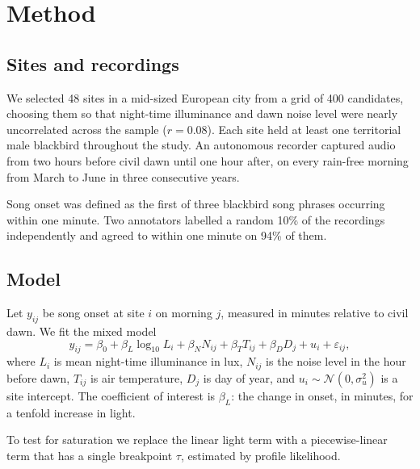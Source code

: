 \section{Method}
\label{sec:method}

\subsection{Sites and recordings}

We selected 48 sites in a mid-sized European city from a grid of 400 candidates, choosing them so that night-time illuminance and dawn noise level were nearly uncorrelated across the sample ($r = 0.08$). Each site held at least one territorial male blackbird throughout the study. An autonomous recorder captured audio from two hours before civil dawn until one hour after, on every rain-free morning from March to June in three consecutive years.

Song onset was defined as the first of three blackbird song phrases occurring within one minute. Two annotators labelled a random 10\% of the recordings independently and agreed to within one minute on 94\% of them.

\subsection{Model}

Let $y_{ij}$ be song onset at site $i$ on morning $j$, measured in minutes relative to civil dawn. We fit the mixed model
\begin{equation}
  y_{ij} = \beta_0 + \beta_L \log_{10} L_i + \beta_N N_{ij} + \beta_T T_{ij} + \beta_D D_j + u_i + \varepsilon_{ij},
  \label{eq:model}
\end{equation}
where $L_i$ is mean night-time illuminance in lux, $N_{ij}$ is the noise level in the hour before dawn, $T_{ij}$ is air temperature, $D_j$ is day of year, and $u_i \sim \mathcal{N}(0, \sigma_u^2)$ is a site intercept. The coefficient of interest is $\beta_L$: the change in onset, in minutes, for a tenfold increase in light.

To test for saturation we replace the linear light term with a piecewise-linear term that has a single breakpoint $\tau$, estimated by profile likelihood.
